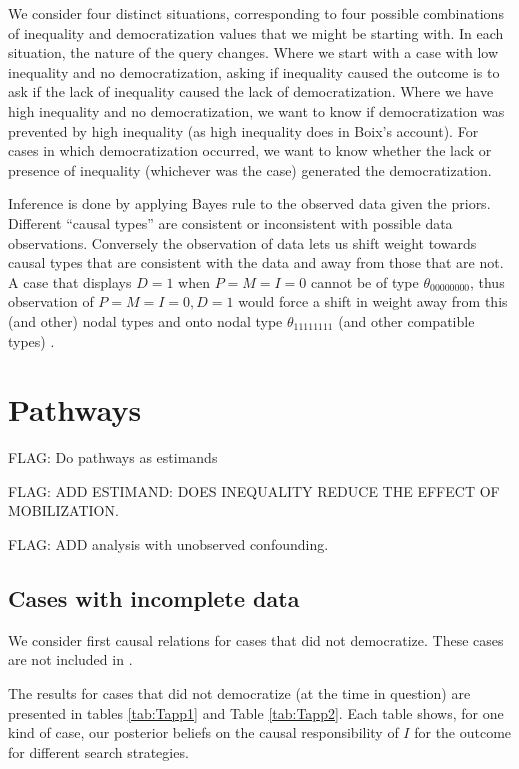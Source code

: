 \documentclass[
  12pt,
]{book}
\begin{document}
We consider four distinct situations, corresponding to four possible combinations of inequality and democratization values that we might be starting with. In each situation, the nature of the query changes. Where we start with a case with low inequality and no democratization, asking if inequality caused the outcome is to ask if the lack of inequality caused the lack of democratization. Where we have high inequality and no democratization, we want to know if democratization was prevented by high inequality (as high inequality does in Boix's account). For cases in which democratization occurred, we want to know whether the lack or presence of inequality (whichever was the case) generated the democratization.

Inference is done by applying Bayes rule to the observed data given the priors. Different ``causal types'' are consistent or inconsistent with possible data observations. Conversely the observation of data lets us shift weight towards causal types that are consistent with the data and away from those that are not. A case that displays \(D=1\) when \(P=M=I=0\) cannot be of type \(\theta_{00000000}\), thus observation of \(P=M=I=0, D=1\) would force a shift in weight away from this (and other) nodal types and onto nodal type \(\theta_{11111111}\) (and other compatible types) .

\hypertarget{pathways}{%
\section{Pathways}\label{pathways}}

FLAG: Do pathways as estimands

FLAG: ADD ESTIMAND: DOES INEQUALITY REDUCE THE EFFECT OF MOBILIZATION.

FLAG: ADD analysis with unobserved confounding.

\hypertarget{cases-with-incomplete-data}{%
\subsection{Cases with incomplete data}\label{cases-with-incomplete-data}}

We consider first causal relations for cases that did not democratize. These cases are not included in \citet{haggard2012inequality}.

The results for cases that did not democratize (at the time in question) are presented in tables \ref{tab:Tapp1} and Table \ref{tab:Tapp2}. Each table shows, for one kind of case, our posterior beliefs on the causal responsibility of \(I\) for the outcome for different search strategies.
\end{document}
